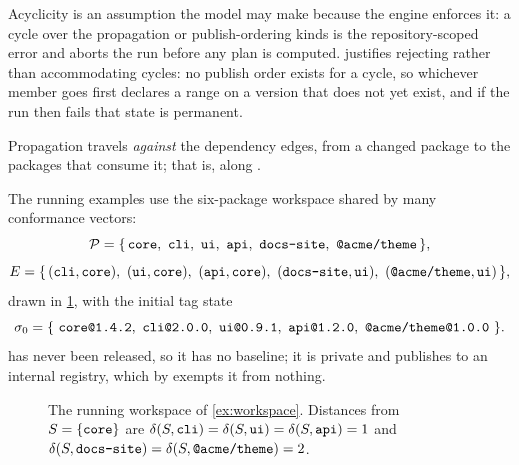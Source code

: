 Acyclicity is an assumption the model may make because the engine enforces it:
a cycle over the propagation or publish-ordering kinds is the repository-scoped
error  and aborts the run before any plan is computed. 
justifies rejecting rather than accommodating cycles: no publish order exists
for a cycle, so whichever member goes first declares a range on a version that
does not yet exist, and if the run then fails that state is permanent.

Propagation travels \emph{against} the dependency edges, from a changed package
to the packages that consume it; that is, along \Dep{\cdot}.

\begin{example}
\label{ex:workspace}
The running examples use the six-package workspace shared by many conformance vectors:
\[
  \Pkgs = \{\,\code{core},\ \code{cli},\ \code{ui},\ \code{api},\
            \code{docs-site},\ \code{@acme/theme}\,\},
\]
\[
  \Edges = \{\,(\code{cli},\code{core}),\ (\code{ui},\code{core}),\
              (\code{api},\code{core}),\ (\code{docs-site},\code{ui}),\
              (\code{@acme/theme},\code{ui})\,\},
\]
drawn in \cref{fig:workspace}, with the initial tag state
\[
  \st_0 = \{\ \code{core@1.4.2},\ \code{cli@2.0.0},\ \code{ui@0.9.1},\
              \code{api@1.2.0},\ \code{@acme/theme@1.0.0}\ \}.
\]
 has never been released, so it has no baseline; it is private
and publishes to an internal registry, which by \spec{13.10a} exempts it from
nothing.
\end{example}

\begin{figure}[t]
\centering
{}
\caption{The running workspace of \cref{ex:workspace}. Distances from
$S=\{\texttt{core}\}$ are $\delta(S,\texttt{cli}) = \delta(S,\texttt{ui}) =
\delta(S,\texttt{api}) = 1$ and $\delta(S,\texttt{docs-site}) =
\delta(S,\texttt{@acme/theme}) = 2$.}
\label{fig:workspace}
\end{figure}

